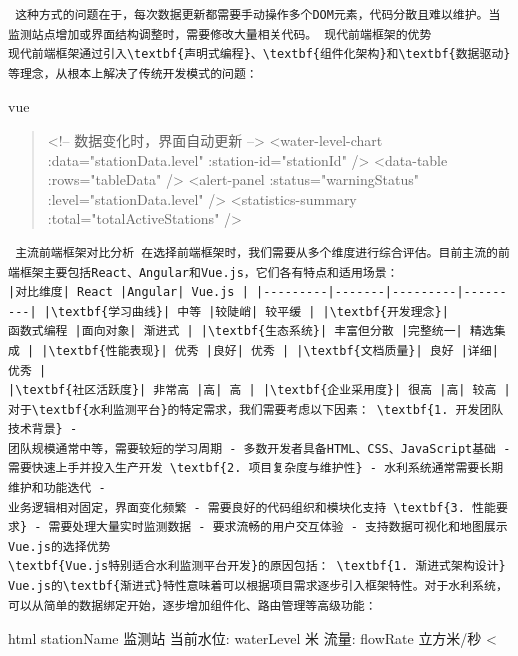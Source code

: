 \begin{lstlisting} 这种方式的问题在于，每次数据更新都需要手动操作多个DOM元素，代码分散且难以维护。当监测站点增加或界面结构调整时，需要修改大量相关代码。 现代前端框架的优势
现代前端框架通过引入\textbf{声明式编程}、\textbf{组件化架构}和\textbf{数据驱动}等理念，从根本上解决了传统开发模式的问题： \end{lstlisting} vue \begin{quote}
 <!--
数据变化时，界面自动更新 --> <water-level-chart :data="stationData.level" :station-id="stationId" /> <data-table :rows="tableData"
/> <alert-panel :status="warningStatus" :level="stationData.level" /> <statistics-summary :total="totalActiveStations"
/> 
\end{quote} \begin{lstlisting} 主流前端框架对比分析 在选择前端框架时，我们需要从多个维度进行综合评估。目前主流的前端框架主要包括React、Angular和Vue.js，它们各有特点和适用场景：
|对比维度| React |Angular| Vue.js | |---------|-------|---------|---------| |\textbf{学习曲线}| 中等 |较陡峭| 较平缓 | |\textbf{开发理念}|
函数式编程 |面向对象| 渐进式 | |\textbf{生态系统}| 丰富但分散 |完整统一| 精选集成 | |\textbf{性能表现}| 优秀 |良好| 优秀 | |\textbf{文档质量}| 良好 |详细| 优秀 |
|\textbf{社区活跃度}| 非常高 |高| 高 | |\textbf{企业采用度}| 很高 |高| 较高 | 对于\textbf{水利监测平台}的特定需求，我们需要考虑以下因素： \textbf{1. 开发团队技术背景} -
团队规模通常中等，需要较短的学习周期 - 多数开发者具备HTML、CSS、JavaScript基础 - 需要快速上手并投入生产开发 \textbf{2. 项目复杂度与维护性} - 水利系统通常需要长期维护和功能迭代 -
业务逻辑相对固定，界面变化频繁 - 需要良好的代码组织和模块化支持 \textbf{3. 性能要求} - 需要处理大量实时监测数据 - 要求流畅的用户交互体验 - 支持数据可视化和地图展示 Vue.js的选择优势
\textbf{Vue.js特别适合水利监测平台开发}的原因包括： \textbf{1. 渐进式架构设计}
Vue.js的\textbf{渐进式}特性意味着可以根据项目需求逐步引入框架特性。对于水利系统，可以从简单的数据绑定开始，逐步增加组件化、路由管理等高级功能： \end{lstlisting} html
\label{water-monitor} { stationName }监测站 当前水位: { waterLevel }米 流量: { flowRate }立方米/秒 \textless
